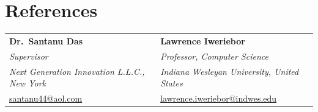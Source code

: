 \documentclass[11pt, letterpaper]{article}
\begin{document}
\section{References}

\renewcommand{\arraystretch}{1.4}
\begin{tabularx}{\linewidth}{@{} X X @{}}
  \textbf{Dr.\ Santanu Das} & \textbf{Lawrence Iweriebor} \\
  \textit{Supervisor} & \textit{Professor, Computer Science} \\
  \textit{Next Generation Innovation L.L.C., New York} & \textit{Indiana Wesleyan University, United States} \\
  \href{mailto:santanu44@aol.com}{santanu44@aol.com} & \href{mailto:lawrence.iweriebor@indwes.edu}{lawrence.iweriebor@indwes.edu} \\
\end{tabularx}
\end{document}
